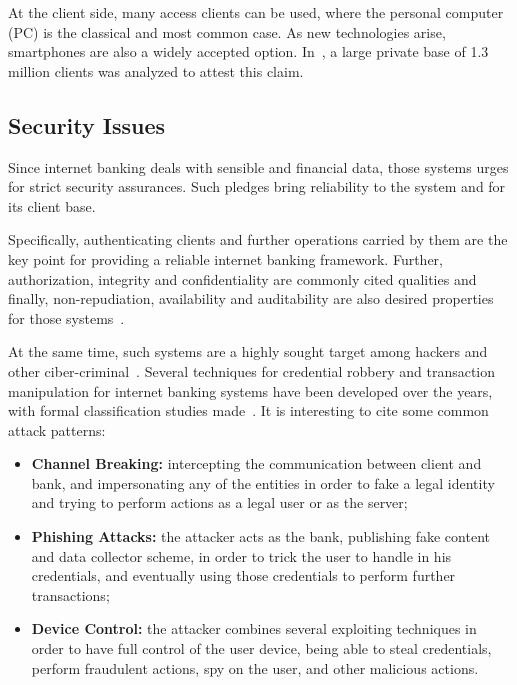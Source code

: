 At the client side, many access clients can be used, where the personal computer (PC) is the classical and most common case. As new technologies arise, smartphones are also a widely accepted option. In~\cite{Peotta2012}, a large private base of 1.3 million clients was analyzed to attest this claim.

\subsection{Security Issues}
Since internet banking deals with sensible and financial data, those systems urges for strict security assurances. Such pledges bring reliability to the system and for its client base.

Specifically, authenticating clients and further operations carried by them are the key point for providing a reliable internet banking framework. Further, authorization, integrity and confidentiality are commonly cited qualities and finally, non-repudiation, availability and auditability are also desired properties for those systems~\cite{Hutchinson2003}.

At the same time, such systems are a highly sought target among hackers and other ciber-criminal~\cite{Peotta2011, Hutchinson2003}. Several techniques for credential robbery and transaction manipulation for internet banking systems have been developed over the years, with formal classification studies made~\cite{Peotta2011, Adham2013}. It is interesting to cite some common attack patterns:

\begin{itemize}
  \item \textbf{Channel Breaking:} intercepting the communication between client and bank, and impersonating any of the entities in order to fake a legal identity and trying to perform actions as a legal user or as the server;

  \item \textbf{Phishing Attacks:} the attacker acts as the bank, publishing fake content and data collector scheme, in order to trick the user to handle in his credentials, and eventually using those credentials to perform further transactions;

  \item \textbf{Device Control:} the attacker combines several exploiting techniques in order to have full control of the user device, being able to steal credentials, perform fraudulent actions, spy on the user, and other malicious actions.
\end{itemize}


